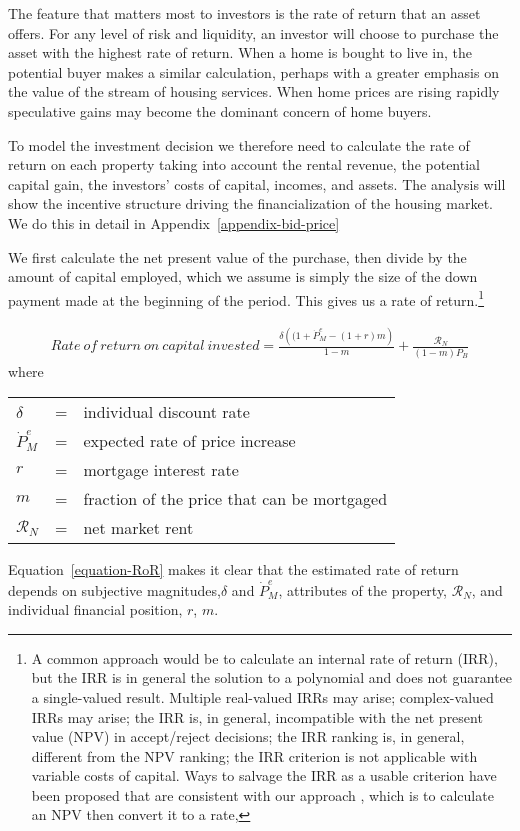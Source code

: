 
The feature that matters most to investors is the  \gls{rate of return} that  an asset offers. For any level of risk and liquidity, an investor will choose to purchase the asset with the highest rate of return. When a home is bought to live in, the potential buyer makes a similar calculation, perhaps with a greater emphasis on the value of the stream of housing services. When home prices are rising rapidly speculative gains may become the dominant concern of home buyers. 

To model the investment decision  we therefore need to calculate the \gls{rate of return} on each property taking into account the rental revenue, the potential capital gain, the investors' costs of capital, incomes, and assets. The analysis will show the incentive structure driving the  financialization of the housing market. We do this in detail in Appendix~\ref{appendix-bid-price} 

We first calculate the net present value of the purchase, then divide by the amount of capital employed, which we assume is simply the size of the down payment made at the beginning of the period. This gives us a rate of return.\footnote{A common approach would be to calculate an internal rate of return (IRR), but  the IRR is in general the solution to a polynomial and does not guarantee a single-valued result.\cite{robinsonOPTIMALTERMINATIONIRR1996} Multiple real-valued  IRRs may arise;  complex-valued IRRs may arise;  the IRR is, in general, incompatible with the net present value (NPV) in accept/reject decisions; the IRR ranking is, in general, different from the NPV ranking; the IRR criterion is not applicable with variable costs of capital. Ways to salvage the IRR as a usable criterion have been proposed that are consistent with our approach \cite{magniAverageInternalRate2010}, which is to calculate an NPV then convert it to a rate,} 

\begin{eqnarray}
Rate\ of\ return\ on\ capital\ invested = \frac{\delta \left((1+ \dot P_M^e - (1+r)m\right)}{1-m} + \frac{\mathcal{R}_N}{(1-m)P_B}\label{equation-RoR}
\end{eqnarray}
where 

\begin{tabular}{lll}
 $\delta$       &=& individual discount rate \\
$\dot P_M^e $   &=& expected rate of price increase \\
$ r$            &=& mortgage interest rate \\
$m$             &=&  fraction of the price that can be mortgaged \\
$\mathcal{R}_N$ &=&  net  market rent
\end{tabular}
Equation~\ref{equation-RoR} makes it clear that the estimated rate of return depends on subjective magnitudes,$\delta$ and $\dot P_M^e$, attributes of the property, $ \mathcal{R}_N$, and  individual financial position, $r$, $m$.

